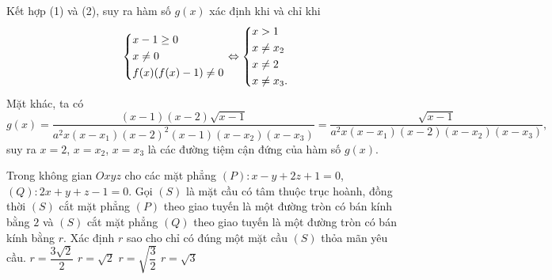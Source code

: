 \begin{ex}
{{
}
\noindent Kết hợp (1) và (2), suy ra hàm số $g(x)$ xác định khi và chỉ khi 
$$\left\{\begin{aligned}&x-1\ge 0\\ &x\ne 0\\ &f(x)(f(x)-1)\ne 0\end{aligned}\right.\Leftrightarrow\left\{\begin{aligned}&x>1\\ &x\ne x_2\\ &x\ne 2\\ &x\ne x_3.\end{aligned}\right.$$
Mặt khác, ta có $$g(x)=\dfrac{(x-1)(x-2)\sqrt{x-1}}{a^2x(x-x_1)(x-2)^2(x-1)(x-x_2)(x-x_3)}=\dfrac{\sqrt{x-1}}{a^2x(x-x_1)(x-2)(x-x_2)(x-x_3)},$$
suy ra $x=2$, $x=x_2$, $x=x_3$ là các đường tiệm cận đứng của hàm số $g(x)$.
}
\end{ex}

\begin{ex}%
Trong không gian $Oxyz$ cho các mặt phẳng $(P)\colon x-y+2z+1=0$, $(Q)\colon 2x+y+z-1=0$. Gọi $(S)$ là mặt cầu có tâm thuộc trục hoành, đồng thời $(S)$ cắt mặt phẳng $(P)$ theo giao tuyến là một đường tròn có bán kính bằng $2$ và $(S)$ cắt mặt phẳng $(Q)$ theo giao tuyến là một đường tròn có bán kính bằng $r$. Xác định $r$ sao cho chỉ có đúng một mặt cầu $(S)$ thỏa mãn yêu cầu.
\choice
{\True $r=\dfrac{3\sqrt{2}}{2}$}
{$r=\sqrt{2}$}
{$r=\sqrt{\dfrac{3}{2}}$}
{$r=\sqrt{3}$}
\end{ex}

